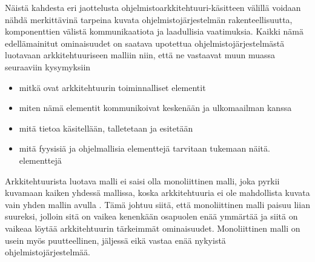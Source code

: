 \documentclass[finnish]{tktltiki2}
\numberwithin{table}{section}
\theoremstyle{definition}
\theoremstyle{remark}
\begin{document}



Näistä kahdesta eri jaottelusta ohjelmistoarkkitehtuuri-käsitteen välillä voidaan nähdä merkittävinä tarpeina kuvata ohjelmistojärjestelmän rakenteellisuutta, komponenttien välistä kommunikaatiota ja laadullisia vaatimuksia. Kaikki nämä edellämainitut ominaisuudet on saatava  upotettua ohjelmistojärjestelmästä luotavaan arkkitehtuuriseen malliin niin, että ne vastaavat muun muassa seuraaviin kysymyksiin \citep[s. 31 - 33]{Rozanski:2011:SSA:2072649} 

\begin{itemize}
	\item mitkä ovat arkkitehtuurin toiminnalliset elementit
	\item miten nämä elementit kommunikoivat keskenään ja ulkomaailman kanssa
	\item mitä tietoa käsitellään, talletetaan ja esitetään
	\item mitä fyysisiä ja ohjelmallisia elementtejä tarvitaan tukemaan näitä. elementtejä
\end{itemize}

Arkkitehtuurista luotava malli ei saisi olla monoliittinen malli, joka pyrkii kuvamaan kaiken yhdessä mallissa, koska arkkitehtuuria ei ole mahdollista kuvata vain yhden mallin avulla \citep{Rozanski:2011:SSA:2072649}. Tämä johtuu siitä, että monoliittinen malli paisuu liian suureksi, jolloin sitä on vaikea kenenkään osapuolen enää ymmärtää ja siitä on vaikeaa löytää arkkitehtuurin tärkeimmät ominaisuudet. Monoliittinen malli on usein myös puutteellinen, jäljessä eikä vastaa enää nykyistä ohjelmistojärjestelmää.  
\end{document}
